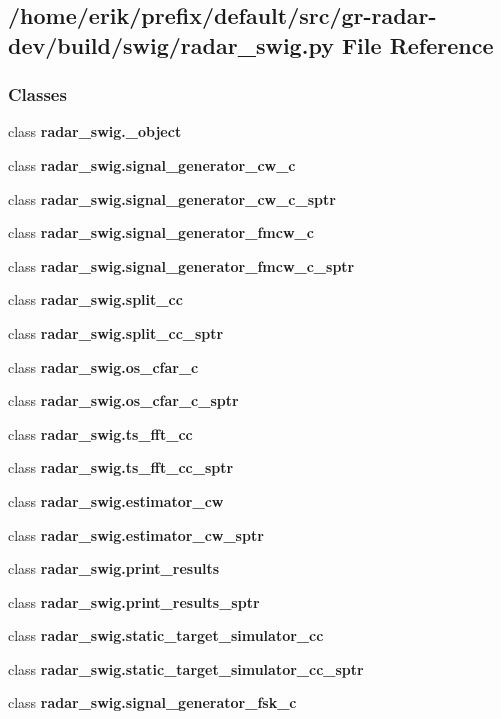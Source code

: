 \subsection{/home/erik/prefix/default/src/gr-\/radar-\/dev/build/swig/radar\+\_\+swig.py File Reference}
\label{radar__swig_8py}
\subsubsection*{Classes}
\begin{DoxyCompactItemize}
\item 
class {\bf radar\+\_\+swig.\+\_\+object}
\item 
class {\bf radar\+\_\+swig.\+signal\+\_\+generator\+\_\+cw\+\_\+c}
\item 
class {\bf radar\+\_\+swig.\+signal\+\_\+generator\+\_\+cw\+\_\+c\+\_\+sptr}
\item 
class {\bf radar\+\_\+swig.\+signal\+\_\+generator\+\_\+fmcw\+\_\+c}
\item 
class {\bf radar\+\_\+swig.\+signal\+\_\+generator\+\_\+fmcw\+\_\+c\+\_\+sptr}
\item 
class {\bf radar\+\_\+swig.\+split\+\_\+cc}
\item 
class {\bf radar\+\_\+swig.\+split\+\_\+cc\+\_\+sptr}
\item 
class {\bf radar\+\_\+swig.\+os\+\_\+cfar\+\_\+c}
\item 
class {\bf radar\+\_\+swig.\+os\+\_\+cfar\+\_\+c\+\_\+sptr}
\item 
class {\bf radar\+\_\+swig.\+ts\+\_\+fft\+\_\+cc}
\item 
class {\bf radar\+\_\+swig.\+ts\+\_\+fft\+\_\+cc\+\_\+sptr}
\item 
class {\bf radar\+\_\+swig.\+estimator\+\_\+cw}
\item 
class {\bf radar\+\_\+swig.\+estimator\+\_\+cw\+\_\+sptr}
\item 
class {\bf radar\+\_\+swig.\+print\+\_\+results}
\item 
class {\bf radar\+\_\+swig.\+print\+\_\+results\+\_\+sptr}
\item 
class {\bf radar\+\_\+swig.\+static\+\_\+target\+\_\+simulator\+\_\+cc}
\item 
class {\bf radar\+\_\+swig.\+static\+\_\+target\+\_\+simulator\+\_\+cc\+\_\+sptr}
\item 
class {\bf radar\+\_\+swig.\+signal\+\_\+generator\+\_\+fsk\+\_\+c}

\end{DoxyCompactItemize}
